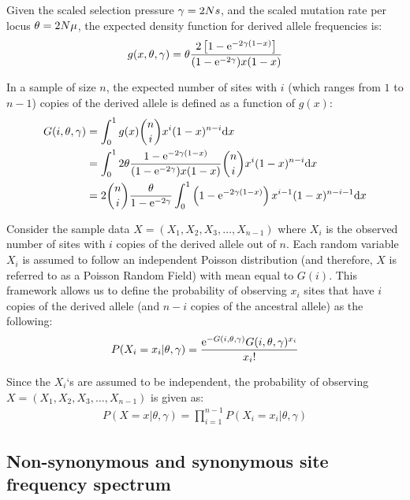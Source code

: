 Given the scaled selection pressure $\gamma=2 N s$, and the scaled mutation rate per locus $\theta = 2 N \mu $, the expected density function for derived allele frequencies is:
\begin{align}
	g(x, \theta, \gamma) = \theta \dfrac{2 \left[ 1 - \mathrm{e}^{-2 \gamma(1-x)}\right]}{(1 - \mathrm{e}^{-2 \gamma})x(1-x)}
\end{align}

In a sample of size $n$, the expected number of sites with $i$ (which ranges from $1$ to $n-1$) copies of the derived allele is defined as a function of $g(x)$:
\begin{align}
	G(i, \theta, \gamma) & = \int_{0}^{1} g(x) \binom{n}{i} x^{i} (1-x)^{n-i} \mathrm{d} x \\
	& = \int_{0}^{1} 2 \theta \dfrac{1 - \mathrm{e}^{-2\gamma(1-x)}}{(1 - \mathrm{e}^{-2\gamma})x(1-x)} \binom{n}{i} x^{i} (1-x)^{n-i} \mathrm{d} x \\
	& = 2 \binom{n}{i} \dfrac{\theta }{1 - \mathrm{e}^{-2\gamma}} \int_{0}^{1} \left( 1 - \mathrm{e}^{-2\gamma(1-x)} \right) x^{i-1} (1-x)^{n-i-1} \mathrm{d} x 
\end{align}

Consider the sample data $X = (X_1, X_2, X_3, \hdots , X_{n-1})$ where $X_i$ is the observed number of sites with $i$ copies of the derived allele out of $n$. Each random variable $X_i$ is assumed to follow an independent Poisson distribution (and therefore, $X$ is referred to as a Poisson
Random Field) with mean equal to $G(i)$. This framework allows us to define the
probability of observing $x_i$ sites that have $i$ copies of the derived allele (and $n-i$ copies of the ancestral allele) as the following:
\begin{align}
	P(X_i = x_i | \theta, \gamma) = \dfrac{\mathrm{e}^{-G(i, \theta, \gamma)} G(i, \theta, \gamma)^{x_i}}{x_i!}
\end{align}

Since the $X_i$‘s are assumed to be independent, the probability of observing $X = (X_1, X_2, X_3, \hdots , X_{n-1})$ is given as:
\begin{align}
	P(X = x | \theta, \gamma) = \prod_{i=1}^{n-1}P(X_i = x_i | \theta, \gamma)
\end{align}

\subsection{Non-synonymous and synonymous site frequency spectrum}

